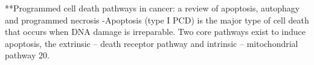 \documentclass[11pt,a4paper]{article}
\begin{document}
**Programmed cell death pathways in cancer: a review of apoptosis, autophagy and programmed necrosis
-Apoptosis (type I PCD) is the major type of cell death that occurs when DNA damage is irreparable. Two core pathways exist to induce apoptosis, the extrinsic – death receptor pathway and intrinsic – mitochondrial pathway 20. 
\end{document}
